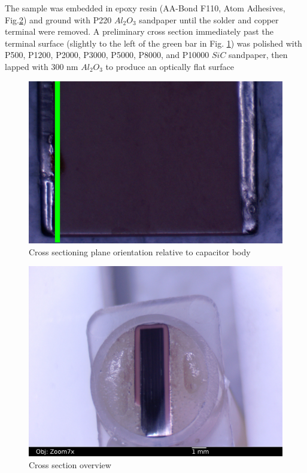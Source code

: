 \documentclass{article}
\begin{document}
The sample was embedded in epoxy resin (AA-Bond F110, Atom Adhesives, Fig.\ref{section-overview}) and ground with P220
$Al_2O_3$ sandpaper until the solder and copper terminal were removed. A preliminary cross section immediately past the
terminal surface (slightly to the left of the green bar in Fig. \ref{section-plane}) was polished with P500, P1200,
P2000, P3000, P5000, P8000, and P10000 $SiC$ sandpaper, then lapped with 300 nm $Al_2O_3$ to produce an optically flat
surface

\begin{figure}[h]
\includegraphics[width=12cm,keepaspectratio]{section-plane.jpg}
\caption{Cross sectioning plane orientation relative to capacitor body}
\label{section-plane}
\end{figure}

\begin{figure}[h]
\includegraphics[width=12cm,keepaspectratio]{07-section1-7x_annotated.jpg}
\caption{Cross section overview}
\label{section-overview}
\end{figure}
\end{document}
